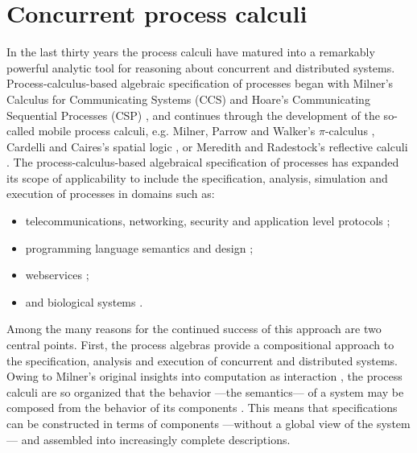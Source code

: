 \section{Concurrent process calculi }\label{sec:concurrent_process_calculi} %
In the last thirty years the process calculi have matured into a
remarkably powerful analytic tool for reasoning about concurrent and
distributed systems. Process-calculus-based algebraic specification of
processes began with Milner's Calculus for Communicating Systems (CCS)
\cite{MilnerCCS80} and Hoare's Communicating Sequential Processes
(CSP) \cite{CSP} \cite{CSP1} \cite{CSP2} \cite{CSP3}, and continues
through the development of the so-called mobile process calculi,
e.g. Milner, Parrow and Walker's $\pi$-calculus \cite{ParrowWalker},
Cardelli and Caires's spatial logic \cite{CairesC04} \cite{CairesC03}
\cite{Caires04}, or Meredith and Radestock's reflective calculi
\cite{MeredithR05} \cite{meredith2005rho}. The process-calculus-based
algebraical specification of processes has expanded its scope of
applicability to include the specification, analysis, simulation and
execution of processes in domains such as:

\begin{itemize}
\item telecommunications, networking, security and application level protocols
\cite{AbadiB02} 
\cite{AbadiB03} 
\cite{BrownLM05} 
\cite{LaneveZ05}; 
\item programming language semantics and design
\cite{BrownLM05}
\cite{djoin}
\cite{JoCaml}
\cite{WojciechowskiS99};
\item webservices
\cite{BrownLM05}
\cite{LaneveZ05}
\cite{MeredithB03};
\item and biological systems
\cite{Cardelli04}
\cite{DanosL03}
\cite{RegevS03}
\cite{PriamiRSS01}.
\end{itemize}

Among the many reasons for the continued success of this approach are
two central points. First, the process algebras provide a
compositional approach to the specification, analysis and execution of
concurrent and distributed systems. Owing to Milner's original
insights into computation as interaction \cite{Milner93}, the process
calculi are so organized that the behavior ---the semantics--- of a
system may be composed from the behavior of its components
\cite{Fokkink}. This means that specifications can be constructed in
terms of components ---without a global view of the system--- and
assembled into increasingly complete descriptions.

